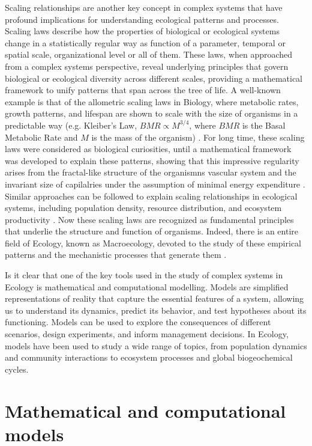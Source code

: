 Scaling relationships are another key concept in complex systems that have
profound implications for understanding ecological patterns and processes.
Scaling laws describe how the properties of biological or ecological systems
change in a statistically regular way as function of a parameter, temporal or
spatial scale, organizational level or all of them. These laws, when approached
from a complex systems perspective, reveal underlying principles that govern
biological or ecological diversity across different scales, providing a
mathematical framework to unify patterns that span across the tree of life. A
well-known example is that of the allometric scaling laws in Biology, where
metabolic rates, growth patterns, and lifespan are shown to scale with the size
of organisms in a predictable way (e.g. Kleiber's Law, $BMR \propto M^{3/4}$,
where $BMR$ is the Basal Metabolic Rate and $M$ is the mass of the organism)
\cite{Peters1983}. For long time, these scaling laws were considered as
biological curiosities, until a mathematical framework was developed to explain
these patterns, showing that this impressive regularity arises from the
fractal-like structure of the organismns vascular system and the invariant size
of capilalries under the assumption of minimal energy expenditure
\cite{West1997}. Similar approaches can be followed to explain scaling
relationships in ecological systems, including population density, resource
distribution, and ecosystem productivity \cite{Brown2004}. Now these scaling
laws are recognized as fundamental principles that underlie the structure and
function of organisms. Indeed, there is an entire field of Ecology, known as
Macroecology, devoted to the study of these empirical patterns and the
mechanistic processes that generate them \cite{Brown1995Macroecology}.

Is it clear that one of the key tools used in the study of complex systems in
Ecology is mathematical and computational modelling. Models are simplified
representations of reality that capture the essential features of a system,
allowing us to understand its dynamics, predict its behavior, and test
hypotheses about its functioning. Models can be used to explore the
consequences of different scenarios, design experiments, and inform management
decisions. In Ecology, models have been used to study a wide range of topics,
from population dynamics and community interactions to ecosystem processes and
global biogeochemical cycles.

\section{\label{sec:Mathematical and computational models} Mathematical and
  computational models}

